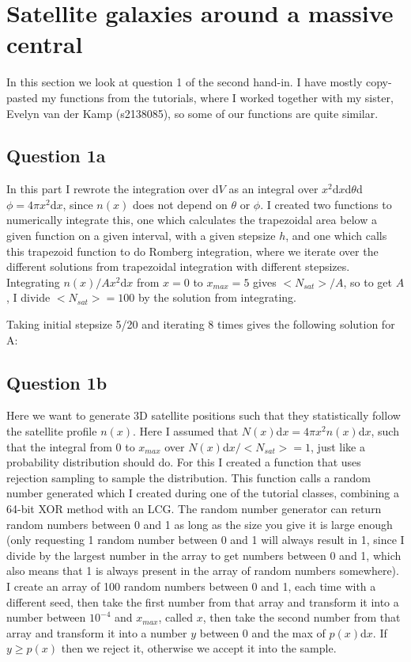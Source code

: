 \section{Satellite galaxies around a massive central}

In this section we look at question 1 of the second hand-in. 
I have mostly copy-pasted my functions from the tutorials, where I worked together with my sister,
Evelyn van der Kamp (s2138085), so some of our functions are quite similar.



\subsection{Question 1a}

In this part I rewrote the integration over d$V$ as an integral over $x^2$d$x$d$\theta$d$\phi = 4\pi x^2$d$x$, since $n(x)$ does not depend on $\theta$ or $\phi$. 
I created two functions to numerically integrate this, one which calculates the trapezoidal area below a given function on a given interval, with a given stepsize $h$, and one which calls this trapezoid function to do Romberg integration, where we iterate over the different solutions from trapezoidal integration with different stepsizes.
Integrating $n(x)/A x^2$d$x$ from $x = 0$ to $x_{max} = 5$ gives $<N_{sat}>/A$, so to get $A$, I divide $<N_{sat}> = 100$ by the solution from integrating. 

Taking initial stepsize 5/20 and iterating 8 times gives the following solution for A:




\subsection{Question 1b}

Here we want to generate 3D satellite positions such that they statistically follow the satellite profile $n(x)$.
Here I assumed that $N(x)$d$x = 4\pi x^2 n(x)$d$x$, such that the integral from 0 to $x_{max}$ over $N(x)$d$x/<N_{sat}> = 1$, just like a probability distribution should do.
For this I created a function that uses rejection sampling to sample the distribution.
This function calls a random number generated which I created during one of the tutorial classes, combining a 64-bit XOR method with an LCG.
The random number generator can return random numbers between 0 and 1 as long as the size you give it is large enough (only requesting 1 random number between 0 and 1 will always result in 1, since I divide by the largest number in the array to get numbers between 0 and 1, which also means that 1 is always present in the array of random numbers somewhere).
I create an array of 100 random numbers between 0 and 1, each time with a different seed, then take the first number from that array and transform it into a number between $10^{-4}$ and $x_{max}$, called $x$, then take the second number from that array and transform it into a number $y$ between 0 and the max of $p(x)$d$x$.
If $y \geq p(x)$ then we reject it, otherwise we accept it into the sample.

